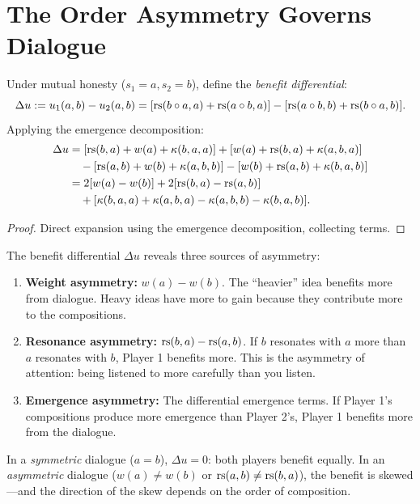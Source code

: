 \section{The Order Asymmetry Governs Dialogue}

\begin{theorem}
\label{thm:order-benefit}
Under mutual honesty ($s_1 = a, s_2 = b$), define the \emph{benefit
differential}:
\[
\Delta u := u_1(a, b) - u_2(a, b)
= [\mathrm{rs}(b \circ a, a) + \mathrm{rs}(a \circ b, a)]
- [\mathrm{rs}(a \circ b, b) + \mathrm{rs}(b \circ a, b)].
\]
Applying the emergence decomposition:
\begin{align*}
\Delta u &= [\mathrm{rs}(b,a) + w(a) + \kappa(b,a,a)] + [w(a) + \mathrm{rs}(b,a) + \kappa(a,b,a)] \\
&\quad - [\mathrm{rs}(a,b) + w(b) + \kappa(a,b,b)] - [w(b) + \mathrm{rs}(a,b) + \kappa(b,a,b)] \\
&= 2[w(a) - w(b)] + 2[\mathrm{rs}(b,a) - \mathrm{rs}(a,b)] \\
&\quad + [\kappa(b,a,a) + \kappa(a,b,a) - \kappa(a,b,b) - \kappa(b,a,b)].
\end{align*}
\end{theorem}

\begin{proof}
Direct expansion using the emergence decomposition, collecting terms.
\end{proof}

\begin{interpretation}
The benefit differential $\Delta u$ reveals three sources of asymmetry:
\begin{enumerate}
\item \textbf{Weight asymmetry:} $w(a) - w(b)$. The ``heavier'' idea benefits
more from dialogue. Heavy ideas have more to gain because they contribute
more to the compositions.
\item \textbf{Resonance asymmetry:} $\mathrm{rs}(b,a) - \mathrm{rs}(a,b)$. If $b$ resonates
with $a$ more than $a$ resonates with $b$, Player 1 benefits more. This is
the asymmetry of attention: being listened to more carefully than you listen.
\item \textbf{Emergence asymmetry:} The differential emergence terms. If
Player 1's compositions produce more emergence than Player 2's, Player 1
benefits more from the dialogue.
\end{enumerate}
In a \emph{symmetric} dialogue ($a = b$), $\Delta u = 0$: both players
benefit equally. In an \emph{asymmetric} dialogue ($w(a) \neq w(b)$ or
$\mathrm{rs}(a,b) \neq \mathrm{rs}(b,a)$), the benefit is skewed---and the direction of
the skew depends on the order of composition.
\end{interpretation}


